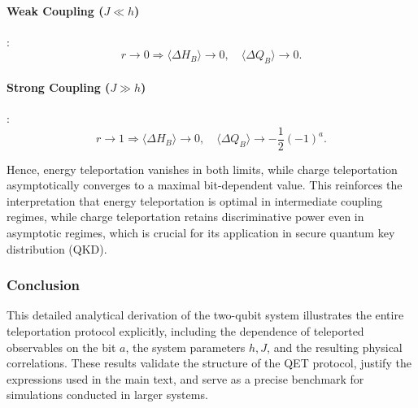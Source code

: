\paragraph{Weak Coupling (\( J \ll h \))}:
\[
r \to 0 \Rightarrow \langle \Delta H_B \rangle \to 0, \quad \langle \Delta Q_B \rangle \to 0.
\]

\paragraph{Strong Coupling (\( J \gg h \))}:
\[
r \to 1 \Rightarrow \langle \Delta H_B \rangle \to 0, \quad \langle \Delta Q_B \rangle \to -\frac{1}{2} (-1)^a.
\]

Hence, energy teleportation vanishes in both limits, while charge teleportation asymptotically converges to a maximal bit-dependent value. This reinforces the interpretation that energy teleportation is optimal in intermediate coupling regimes, while charge teleportation retains discriminative power even in asymptotic regimes, which is crucial for its application in secure quantum key distribution (QKD).

\subsubsection{Conclusion}

This detailed analytical derivation of the two-qubit system illustrates the entire teleportation protocol explicitly, including the dependence of teleported observables on the bit \( a \), the system parameters \( h, J \), and the resulting physical correlations. These results validate the structure of the QET protocol, justify the expressions used in the main text, and serve as a precise benchmark for simulations conducted in larger systems.
